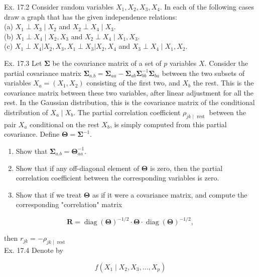 \documentclass[10pt]{article}
\begin{document}
Ex. 17.2 Consider random variables $X_{1}, X_{2}, X_{3}, X_{4}$. In each of the following cases draw a graph that has the given independence relations:\\
(a) $X_{1} \perp X_{3} \mid X_{2}$ and $X_{2} \perp X_{4} \mid X_{3}$.\\
(b) $X_{1} \perp X_{4} \mid X_{2}, X_{3}$ and $X_{2} \perp X_{4} \mid X_{1}, X_{3}$.\\
(c) $X_{1} \perp X_{4}\left|X_{2}, X_{3}, X_{1} \perp X_{3}\right| X_{2}, X_{4}$ and $X_{3} \perp X_{4} \mid X_{1}, X_{2}$.

Ex. 17.3 Let $\boldsymbol{\Sigma}$ be the covariance matrix of a set of $p$ variables $X$. Consider the partial covariance matrix $\boldsymbol{\Sigma}_{a . b}=\boldsymbol{\Sigma}_{a a}-\boldsymbol{\Sigma}_{a b} \boldsymbol{\Sigma}_{b b}^{-1} \boldsymbol{\Sigma}_{b a}$ between the two subsets of variables $X_{a}=\left(X_{1}, X_{2}\right)$ consisting of the first two, and $X_{b}$ the rest. This is the covariance matrix between these two variables, after linear adjustment for all the rest. In the Gaussian distribution, this is the covariance matrix of the conditional distribution of $X_{a} \mid X_{b}$. The partial correlation coefficient $\rho_{j k \mid \text { rest }}$ between the pair $X_{a}$ conditional on the rest $X_{b}$, is simply computed from this partial covariance. Define $\boldsymbol{\Theta}=\boldsymbol{\Sigma}^{-1}$.

\begin{enumerate}
  \item Show that $\boldsymbol{\Sigma}_{a . b}=\boldsymbol{\Theta}_{a a}^{-1}$.
  \item Show that if any off-diagonal element of $\boldsymbol{\Theta}$ is zero, then the partial correlation coefficient between the corresponding variables is zero.
  \item Show that if we treat $\boldsymbol{\Theta}$ as if it were a covariance matrix, and compute the corresponding "correlation" matrix
\end{enumerate}


\begin{equation*}
\mathbf{R}=\operatorname{diag}(\boldsymbol{\Theta})^{-1 / 2} \cdot \boldsymbol{\Theta} \cdot \operatorname{diag}(\boldsymbol{\Theta})^{-1 / 2}, \tag{17.40}
\end{equation*}


then $r_{j k}=-\rho_{j k \mid \text { rest }}$\\
Ex. 17.4 Denote by

$$
f\left(X_{1} \mid X_{2}, X_{3}, \ldots, X_{p}\right)
$$
\end{document}
